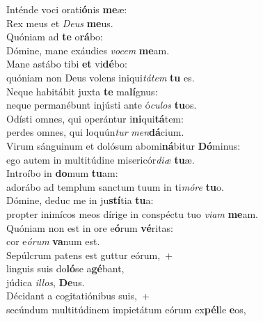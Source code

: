 \evenverse Inténde voci orati\textbf{ó}nis \textbf{me}æ:~\*\\
\evenverse Rex meus et \textit{De}\textit{us} \textbf{me}us.\\
\oddverse Quóniam ad \textbf{te} o\textbf{rá}bo:~\*\\
\oddverse Dómine, mane exáudies \textit{vo}\textit{cem} \textbf{me}am.\\
\evenverse Mane astábo tibi \textbf{et} vi\textbf{dé}bo:~\*\\
\evenverse quóniam non Deus volens iniqui\textit{tá}\textit{tem} \textbf{tu} es.\\
\oddverse Neque habitábit juxta \textbf{te} ma\textbf{lí}gnus:~\*\\
\oddverse neque permanébunt injústi ante ó\textit{cu}\textit{los} \textbf{tu}os.\\
\evenverse Odísti omnes, qui operántur i\textbf{ni}qui\textbf{tá}tem:~\*\\
\evenverse perdes omnes, qui loquún\textit{tur} \textit{men}\textbf{dá}cium.\\
\oddverse Virum sánguinum et dolósum abomi\textbf{ná}bitur \textbf{Dó}minus:~\*\\
\oddverse ego autem in multitúdine misericór\textit{di}\textit{æ} \textbf{tu}æ.\\
\evenverse Introíbo in \textbf{do}mum \textbf{tu}am:~\*\\
\evenverse adorábo ad templum sanctum tuum in ti\textit{mó}\textit{re} \textbf{tu}o.\\
\oddverse Dómine, deduc me in ju\textbf{stí}tia \textbf{tu}a:~\*\\
\oddverse propter inimícos meos dírige in conspéctu tuo \textit{vi}\textit{am} \textbf{me}am.\\
\evenverse Quóniam non est in ore e\textbf{ó}rum \textbf{vé}ritas:~\*\\
\evenverse cor e\textit{ó}\textit{rum} \textbf{va}num est.\\
\oddverse Sepúlcrum patens est guttur eórum,~+\\
\oddverse  linguis suis do\textbf{ló}se a\textbf{gé}bant,~\*\\
\oddverse júdica \textit{il}\textit{los}, \textbf{De}us.\\
\evenverse Décidant a cogitatiónibus suis,~+\\
\evenverse  secúndum multitúdinem impietátum eórum ex\textbf{pél}le \textbf{e}os,~\*\\
